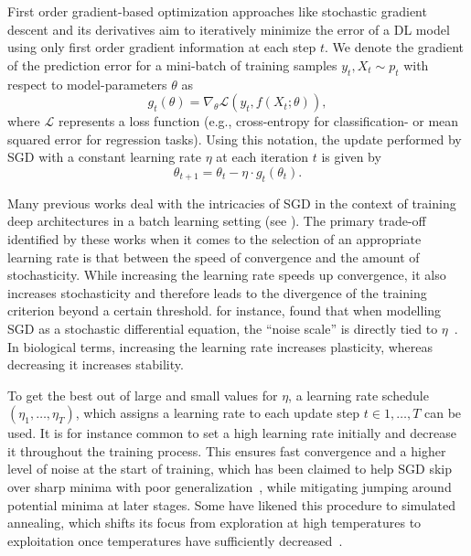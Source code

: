 \documentclass[letterpaper]{article} %
\begin{document}
First order gradient-based optimization approaches like stochastic gradient descent and its derivatives aim to iteratively minimize the error of a DL model using only first order gradient information at each step $t$. We denote the gradient of the prediction error for a mini-batch of training samples $y_t, X_t \sim p_t$ with respect to model-parameters $\theta$ as
\begin{equation}
	g_t(\theta)   =   \nabla_{\theta} \mathcal{L}(y_t, f(X_t; \theta)),
\end{equation}
where $\mathcal{L}$ represents a loss function (e.g., cross-entropy for classification- or mean squared error for regression tasks). Using this notation, the update performed by SGD with a constant learning rate $\eta$ at each iteration $t$ is given by
\begin{equation}
	\theta_{t+1}  = \theta_{t} - \eta \cdot g_t(\theta_t).
\end{equation}

Many previous works deal with the intricacies of SGD in the context of training deep architectures in a batch learning setting (see \citet{bengioPracticalRecommendationsGradientbased2012,bottouStochasticGradientDescent2012,Goodfellow-et-al-2016}).
The primary trade-off identified by these works when it comes to  the selection of an appropriate learning rate is that between the speed of convergence and the amount of stochasticity.
While increasing the learning rate speeds up convergence, it also increases stochasticity and therefore leads to the divergence of the training criterion beyond a certain threshold.
 for instance, found that when modelling SGD as a stochastic differential equation, the “noise scale” is directly tied to $\eta$~\cite{smithBayesianPerspectiveGeneralization2018}.
In biological terms, increasing the learning rate increases plasticity, whereas decreasing it increases stability. %


To get the best out of large and small values for $\eta$, a learning rate schedule $(\eta_1,\ldots,\eta_T)$, which assigns a learning rate to each update step $t \in 1,\ldots,T$ can be used.
It is for instance common to set a high learning rate initially and decrease it throughout the training process.
This ensures fast convergence and a higher level of noise at the start of training, which has been claimed to help SGD skip over sharp minima with poor generalization~\cite{hochreiterFlatMinima1997,chaudhariEntropySGDBiasingGradient2017}, while mitigating jumping around potential minima at later stages.
Some have likened this procedure to simulated annealing, which shifts its focus from exploration at high temperatures to exploitation once temperatures have sufficiently decreased~\cite{smithDonDecayLearning2018}.
\end{document}
